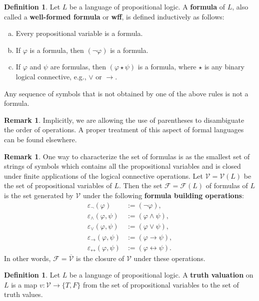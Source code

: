 \documentclass[12pt]{article}
\theoremstyle{definition}
\newtheorem{definition}[theorem]{Definition}
\newtheorem{remark}[theorem]{Remark}
\newcommand{\eps}{\varepsilon}
\renewcommand{\phi}{\varphi}
\newcommand{\<}{\langle}
\renewcommand{\>}{\rangle}
\newcommand{\clo}{\overline}
\newcommand{\FF}{\mathcal{F}}
\newcommand{\VV}{\mathcal{V}}
\newcommand{\keyword}{\textbf}
\newcommand{\liff}{\leftrightarrow}
\begin{document}
\begin{definition}
    Let $L$ be a language of propositional logic.
    A \keyword{formula} of $L$, also called a \keyword{well-formed formula} or \keyword{wff}, is defined inductively as follows:
    \begin{enumerate}[(a)]
        \item Every propositional variable is a formula.
        \item If $\phi$ is a formula, then $(\lnot\phi)$ is a formula.
        \item If $\phi$ and $\psi$ are formulas, then $(\phi \star \psi)$ is a formula, where $\star$ is any binary logical connective, e.g., $\lor$ or $\to$.
    \end{enumerate}
    Any sequence of symbols that is not obtained by one of the above rules is not a formula.
\end{definition}

\begin{remark}
    Implicitly, we are allowing the use of parentheses to disambiguate the order of operations.
    A proper treatment of this aspect of formal languages can be found elsewhere.
\end{remark}

\begin{remark}
    One way to characterize the set of formulas is as the smallest set of strings of symbols which contains all the propositional variables and is closed under finite applications of the logical connective operations.
    Let $\VV = \VV(L)$ be the set of propositional variables of $L$.
    Then the set $\FF = \FF(L)$ of formulas of $L$ is the set generated by $\VV$ under the following \keyword{formula building operations}:
    \begin{align*}
        \eps_\lnot(\phi) &:= (\lnot \phi), \\
        \eps_\land(\phi, \psi) &:= (\phi \land \psi), \\
        \eps_\lor(\phi, \psi) &:= (\phi \lor \psi), \\
        \eps_\to(\phi, \psi) &:= (\phi \to \psi), \\
        \eps_\liff(\phi, \psi) &:= (\phi \liff \psi).
    \end{align*}
    In other words, $\FF = \clo{\VV}$ is the closure of $\VV$ under these operations. 
\end{remark}

\begin{definition}
    Let $L$ be a language of propositional logic.
    A \keyword{truth valuation} on $L$ is a map $v : \VV \to \{T, F\}$ from the set of propositional variables to the set of truth values.
\end{definition}
\end{document}
